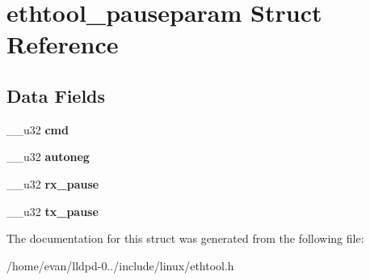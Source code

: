 \section{ethtool\-\_\-pauseparam \-Struct \-Reference}
\label{structethtool__pauseparam}
\subsection*{\-Data \-Fields}
\begin{DoxyCompactItemize}
\item 
\-\_\-\-\_\-u32 {\bfseries cmd}\label{structethtool__pauseparam_a66d231264d5aa36fd7d347e2c967769a}

\item 
\-\_\-\-\_\-u32 {\bfseries autoneg}\label{structethtool__pauseparam_a658b64094115d64999553173d8f8cda4}

\item 
\-\_\-\-\_\-u32 {\bfseries rx\-\_\-pause}\label{structethtool__pauseparam_acf5697a4f255fe841d0aaeb505b3757b}

\item 
\-\_\-\-\_\-u32 {\bfseries tx\-\_\-pause}\label{structethtool__pauseparam_a7da69370732917b4c43c12472403b7de}

\end{DoxyCompactItemize}


\-The documentation for this struct was generated from the following file\-:\begin{DoxyCompactItemize}
\item 
/home/evan/lldpd-\/0../include/linux/ethtool.\-h\end{DoxyCompactItemize}
